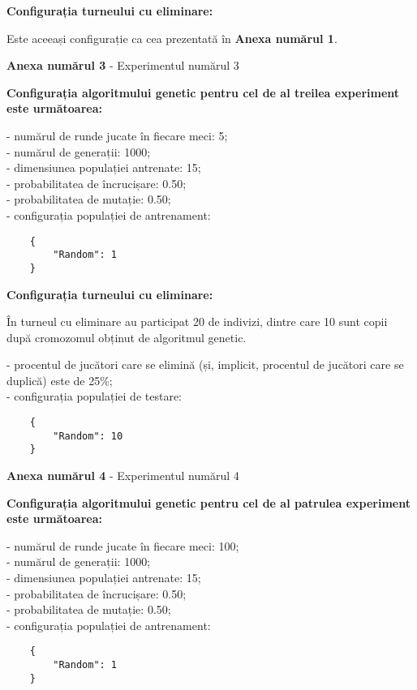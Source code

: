 \textbf{Configurația turneului cu eliminare:}

Este aceeași configurație ca cea prezentată în \textbf{Anexa numărul 1}.

\clearpage

\begin{center}
	\textbf{Anexa numărul 3} - Experimentul numărul 3
\end{center}

\textbf{Configurația algoritmului genetic pentru cel de al treilea experiment este următoarea:}

- numărul de runde jucate în fiecare meci: 5;\\
- numărul de generații: 1000;\\
- dimensiunea populației antrenate: 15;\\
- probabilitatea de încrucișare: 0.50;\\
- probabilitatea de mutație: 0.50;\\
- configurația populației de antrenament:\\
\begin{center}
	\begin{lstlisting}
	{
		"Random": 1
	}
	\end{lstlisting}
\end{center}

\textbf{Configurația turneului cu eliminare:}

În turneul cu eliminare au participat 20 de indivizi, dintre care 10 sunt copii după cromozomul obținut de algoritmul genetic. 

- procentul de jucători care se elimină (și, implicit, procentul de jucători care se duplică) este de 25\%;\\
- configurația populației de testare:\\
\begin{center}
	\begin{lstlisting}
	{
		"Random": 10
	}
	\end{lstlisting}
\end{center}

\clearpage

\begin{center}
	\textbf{Anexa numărul 4} - Experimentul numărul 4
\end{center}

\textbf{Configurația algoritmului genetic pentru cel de al patrulea experiment este următoarea:}

- numărul de runde jucate în fiecare meci: 100;\\
- numărul de generații: 1000;\\
- dimensiunea populației antrenate: 15;\\
- probabilitatea de încrucișare: 0.50;\\
- probabilitatea de mutație: 0.50;\\
- configurația populației de antrenament:\\
\begin{center}
	\begin{lstlisting}
	{
		"Random": 1
	}
	\end{lstlisting}
\end{center}

